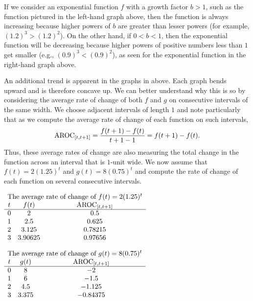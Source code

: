 \documentclass[nooutcomes]{ximera}
\begin{document}
If we consider an exponential function $f$ with a growth factor $b > 1$, such as the function pictured in the left-hand graph above, then the function is always increasing because higher powers of $b$ are greater than lesser powers (for example, $(1.2)^3 > (1.2)^2$).  On the other hand, if $0 < b < 1$, then the exponential function will be decreasing because higher powers of positive numbers less than $1$ get smaller (e.g., $(0.9)^3 < (0.9)^2$), as seen for the exponential function in the right-hand graph above.

An additional trend is apparent in the graphs in above.  Each graph bends upward and is therefore concave up.  We can better understand why this is so by considering the average rate of change of both $f$ and $g$ on consecutive intervals of the same width.  We choose adjacent intervals of length $1$ and note particularly that as we compute the average rate of change of each function on such intervals,%
\begin{equation*}
\mathrm{AROC}_{[t,t+1]} = \frac{f(t+1) - f(t)}{t+1-1} = f(t+1) - f(t)\text{.}
\end{equation*}
Thus, these average rates of change are also measuring the total change in the function across an interval that is $1$-unit wide. We now assume that $f(t) = 2 (1.25)^t$ and $g(t) = 8(0.75)^t$ and compute the rate of change of each function on several consecutive intervals.


\begin{center}
$
{\begin{array}{ccc}
\multicolumn{3}{c}{\text{The average rate of change of } f(t) = 2(1.25)^t}\\
t&f(t)&\av_{[t,t+1]}\\
\hline
0&2&0.5\\
1&2.5&0.625\\
2&3.125&0.78215\\
3&3.90625&0.97656
\end{array}}%
$
\end{center}
\begin{center}
$
{\begin{array}{ccc}
\multicolumn{3}{c}{\text{The average rate of change of } g(t) = 8(0.75)^t}\\
t&g(t)&\av_{[t,t+1]}\\
\hline
0&8&-2\\
1&6&-1.5\\
2&4.5&-1.125\\
3&3.375&-0.84375
\end{array}}%
$
\end{center}
\end{document}
